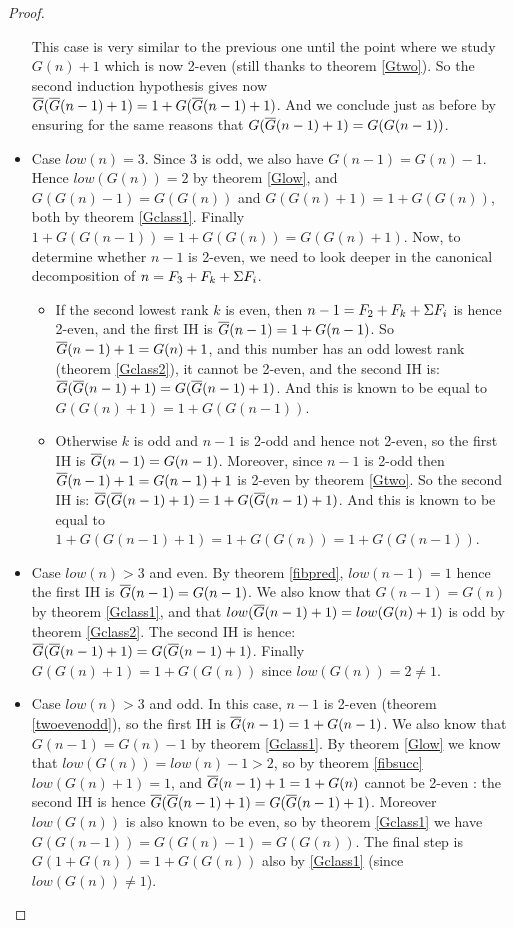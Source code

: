 \documentclass[a4paper,11pt]{article}
\begin{document}
\begin{proof}
\begin{itemize}
  This case is very similar to the previous one until the point
  where we study $G(n)+1$ which is now 2-even (still thanks to theorem
  \ref{Gtwo}).
  So the second induction hypothesis gives now
  $\overline{G}(\overline{G}(n-1)+1) = 1+G(\overline{G}(n-1)+1)$. And we conclude just as before
  by ensuring for the same reasons that $G(\overline{G}(n-1)+1)=G(G(n-1))$.
\item Case $low(n)=3$.
  Since 3 is odd, we also have $G(n-1)=G(n)-1$.
  Hence $low(G(n))=2$ by theorem \ref{Glow}, and $G(G(n)-1)=G(G(n))$
  and $G(G(n)+1)=1+G(G(n))$, both by theorem \ref{Gclass1}.
  Finally $1+G(G(n-1)) = 1+G(G(n)) = G(G(n)+1)$.
  Now, to determine whether $n-1$ is 2-even,
  we need to look deeper in the canonical decomposition of
  $n = F_3+F_k+\Sigma F_i$.
  \begin{itemize}
  \item If the second lowest rank $k$ is even, then
    $n-1 = F_2+F_k+\Sigma F_i$ is hence 2-even, and the first IH is
    $\overline{G}(n-1)=1+G(n-1)$. So
    $\overline{G}(n-1)+1=G(n)+1$, and this number has an odd lowest rank
    (theorem \ref{Gclass2}), it cannot be 2-even, and the second IH
    is:
    $\overline{G}(\overline{G}(n-1)+1)=G(\overline{G}(n-1)+1)$. And this is known to be equal
    to $G(G(n)+1)=1+G(G(n-1))$.
  \item Otherwise $k$ is odd and $n-1$ is 2-odd
    and hence not 2-even, so the first IH is $\overline{G}(n-1)=G(n-1)$.
    Moreover, since $n-1$ is 2-odd then $\overline{G}(n-1)+1=G(n-1)+1$ is 2-even by
    theorem \ref{Gtwo}. So the second IH is:
    $\overline{G}(\overline{G}(n-1)+1)=1+G(\overline{G}(n-1)+1)$. And this is known to be equal
    to $1+G(G(n-1)+1)=1+G(G(n))=1+G(G(n-1))$.
  \end{itemize}
\item Case $low(n)>3$ and even.
  By theorem \ref{fibpred}, $low(n-1)=1$ hence the first IH is
  $\overline{G}(n-1)=G(n-1)$. We also know that $G(n-1)=G(n)$ by theorem
  \ref{Gclass1}, and that $low(\overline{G}(n-1)+1)=low(G(n)+1)$ is odd
  by theorem \ref{Gclass2}. The second IH is hence:
  $\overline{G}(\overline{G}(n-1)+1) = G(\overline{G}(n-1)+1)$. Finally
  $G(G(n)+1)=1+G(G(n))$ since $low(G(n))=2\neq 1$.
\item Case $low(n)>3$ and odd.
  In this case, $n-1$ is 2-even (theorem \ref{twoevenodd}), so
  the first IH is $\overline{G}(n-1)=1+G(n-1)$. We also know that
  $G(n-1)=G(n)-1$ by theorem \ref{Gclass1}.
  By theorem \ref{Glow} we know that $low(G(n))=low(n)-1 > 2$, so
  by theorem \ref{fibsucc} $low(G(n)+1)=1$, and
  $\overline{G}(n-1)+1=1+G(n)$ cannot be 2-even : the second IH is hence
  $\overline{G}(\overline{G}(n-1)+1)=G(\overline{G}(n-1)+1)$. Moreover $low(G(n))$ is
  also known to be even, so 
  by theorem \ref{Gclass1} we have $G(G(n-1))=G(G(n)-1)=G(G(n))$.
  The final step is 
  $G(1+G(n))=1+G(G(n))$ also by \ref{Gclass1} (since $low(G(n))\neq
  1$).
\end{itemize}
\end{proof}
\end{document}
